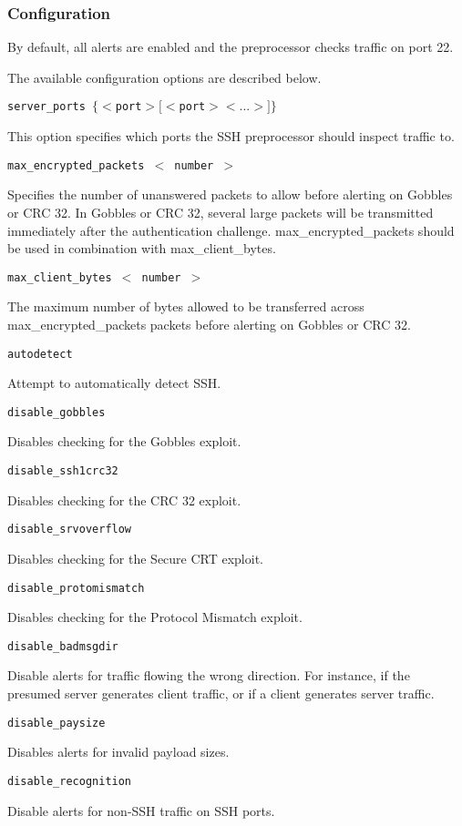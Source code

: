 \documentclass[english]{report}
\newcounter{slistnum}
\newenvironment{slist}
{ \begin{list}{ {\bf \arabic{slistnum}.} }{\usecounter{slistnum} } }
{ \end{list} }
\begin{document}
\subsubsection{Configuration}

By default, all alerts are enabled and the preprocessor checks traffic on port
22.

The available configuration options are described below.

\begin{slist}

\item \texttt{server\_ports $\{ <$port$> [<$port$> <...>] \}$}

This option specifies which ports the SSH preprocessor should inspect traffic
to.

\item \texttt{max\_encrypted\_packets $<$ number $>$}

Specifies the number of unanswered packets to allow before alerting on Gobbles
or CRC 32.  In Gobbles or CRC 32, several large packets will be transmitted
immediately after the authentication challenge.  max\_encrypted\_packets should
be used in combination with max\_client\_bytes.

\item \texttt{max\_client\_bytes $<$ number $>$}

The maximum number of bytes allowed to be transferred across
max\_encrypted\_packets packets before alerting on Gobbles or CRC 32.

\item \texttt{autodetect}

Attempt to automatically detect SSH.

\item \texttt{disable\_gobbles}

Disables checking for the Gobbles exploit.

\item \texttt{disable\_ssh1crc32}

Disables checking for the CRC 32 exploit.

\item \texttt{disable\_srvoverflow}

Disables checking for the Secure CRT exploit.

\item \texttt{disable\_protomismatch}

Disables checking for the Protocol Mismatch exploit.

\item \texttt{disable\_badmsgdir}

Disable alerts for traffic flowing the wrong direction. For instance, if the
presumed server generates client traffic, or if a client generates server
traffic.

\item \texttt{disable\_paysize}

Disables alerts for invalid payload sizes.

\item \texttt{disable\_recognition}

Disable alerts for non-SSH traffic on SSH ports.

\end{slist}
\end{document}
